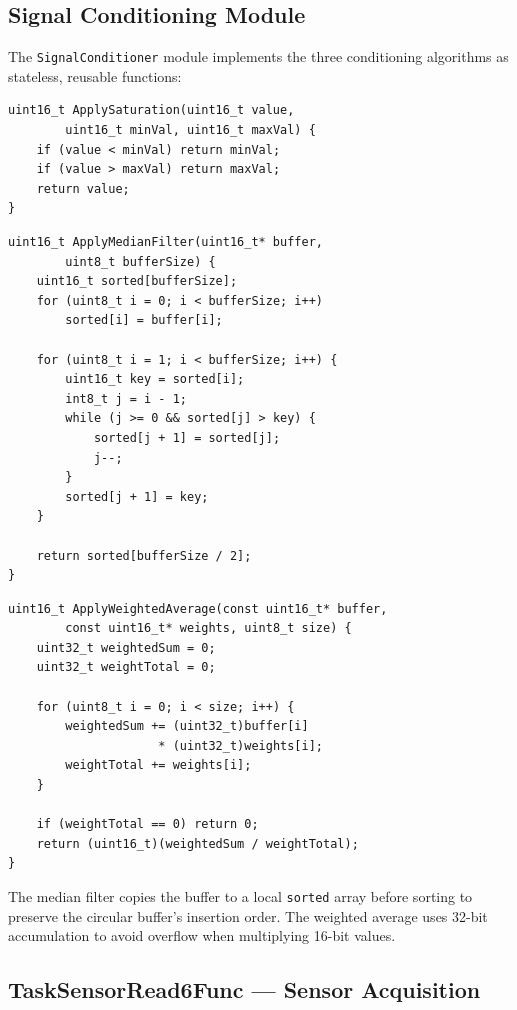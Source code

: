\documentclass[12pt]{article}
\begin{document}
\subsection{Signal Conditioning Module}

The \texttt{SignalConditioner} module implements the three conditioning algorithms as stateless, reusable functions:

\begin{lstlisting}[caption={SignalConditioner --- saturation}]
uint16_t ApplySaturation(uint16_t value,
        uint16_t minVal, uint16_t maxVal) {
    if (value < minVal) return minVal;
    if (value > maxVal) return maxVal;
    return value;
}
\end{lstlisting}

\begin{lstlisting}[caption={SignalConditioner --- median filter (insertion sort)}]
uint16_t ApplyMedianFilter(uint16_t* buffer,
        uint8_t bufferSize) {
    uint16_t sorted[bufferSize];
    for (uint8_t i = 0; i < bufferSize; i++)
        sorted[i] = buffer[i];

    for (uint8_t i = 1; i < bufferSize; i++) {
        uint16_t key = sorted[i];
        int8_t j = i - 1;
        while (j >= 0 && sorted[j] > key) {
            sorted[j + 1] = sorted[j];
            j--;
        }
        sorted[j + 1] = key;
    }

    return sorted[bufferSize / 2];
}
\end{lstlisting}

\begin{lstlisting}[caption={SignalConditioner --- weighted moving average}]
uint16_t ApplyWeightedAverage(const uint16_t* buffer,
        const uint16_t* weights, uint8_t size) {
    uint32_t weightedSum = 0;
    uint32_t weightTotal = 0;

    for (uint8_t i = 0; i < size; i++) {
        weightedSum += (uint32_t)buffer[i]
                     * (uint32_t)weights[i];
        weightTotal += weights[i];
    }

    if (weightTotal == 0) return 0;
    return (uint16_t)(weightedSum / weightTotal);
}
\end{lstlisting}

The median filter copies the buffer to a local \texttt{sorted} array before sorting to preserve the circular buffer's insertion order. The weighted average uses 32-bit accumulation to avoid overflow when multiplying 16-bit values.

\subsection{TaskSensorRead6Func --- Sensor Acquisition}
\end{document}
